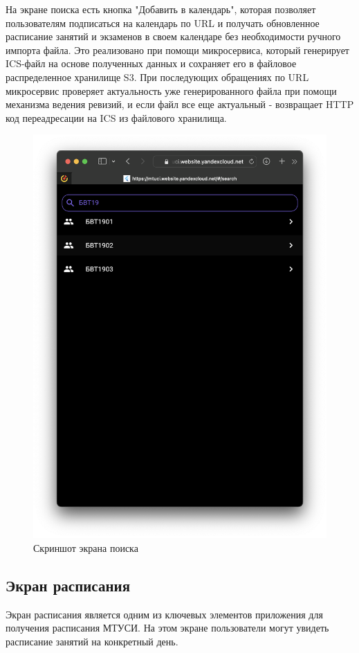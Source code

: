 На экране поиска есть кнопка "Добавить в календарь",
которая позволяет пользователям подписаться на календарь по URL
и получать обновленное расписание занятий и экзаменов
в своем календаре без необходимости ручного импорта файла.
Это реализовано при помощи микросервиса, который генерирует ICS-файл
на основе полученных данных и сохраняет его в файловое распределенное хранилище S3.
При последующих обращениях по URL микросервис проверяет актуальность
уже генерированного файла при помощи механизма ведения ревизий,
и если файл все еще актуальный - возвращает HTTP код переадресации на ICS из файлового хранилища.

\begin{figure}
\centering
\includegraphics[width=0.8\linewidth]{images/app/search.png}
\caption{Скриншот экрана поиска}
\label{fig:app:search}
\end{figure}

\subsection{Экран расписания}
Экран расписания является одним из ключевых элементов приложения для получения расписания МТУСИ.
На этом экране пользователи могут увидеть расписание занятий на конкретный день.

